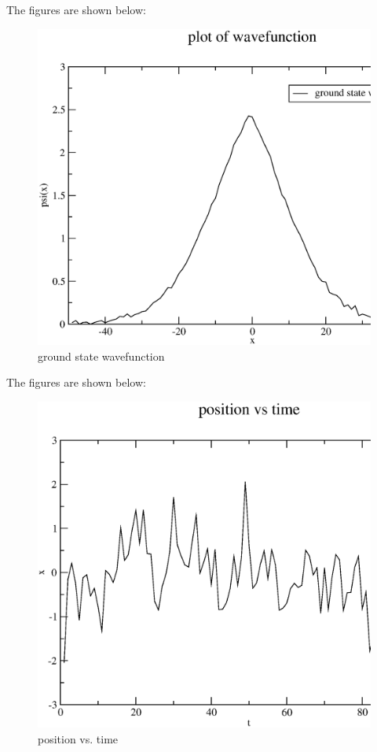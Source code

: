 \documentclass[11pt,a4paper,english]{article}
\begin{document}
	    The figures are shown below:\\
	\begin{figure}[h!]
	\centering
	\includegraphics [scale=0.6]{figures/hw10qn3a.eps}
	\caption{ground state wavefunction }
	\end{figure}
	\clearpage
	
		    The figures are shown below:\\
	\begin{figure}[h!]
	\centering
	\includegraphics [scale=0.6]{figures/hw10qn3b.eps}
	\caption{position vs. time }
	\end{figure}
	\clearpage
\end{document}

